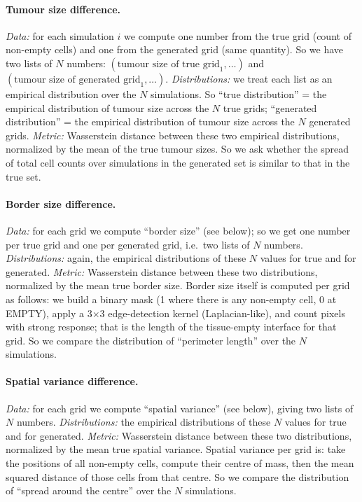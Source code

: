 \documentclass[11pt,a4paper]{article}
\begin{document}
\paragraph{Tumour size difference.} \emph{Data:} for each simulation \(i\) we compute one number from the true grid (count of non-empty cells) and one from the generated grid (same quantity). So we have two lists of \(N\) numbers: \((\text{tumour size of true grid}_1,\dots)\) and \((\text{tumour size of generated grid}_1,\dots)\). \emph{Distributions:} we treat each list as an empirical distribution over the \(N\) simulations. So ``true distribution'' = the empirical distribution of tumour size across the \(N\) true grids; ``generated distribution'' = the empirical distribution of tumour size across the \(N\) generated grids. \emph{Metric:} Wasserstein distance between these two empirical distributions, normalized by the mean of the true tumour sizes. So we ask whether the spread of total cell counts over simulations in the generated set is similar to that in the true set.

\paragraph{Border size difference.} \emph{Data:} for each grid we compute ``border size'' (see below); so we get one number per true grid and one per generated grid, i.e.\ two lists of \(N\) numbers. \emph{Distributions:} again, the empirical distributions of these \(N\) values for true and for generated. \emph{Metric:} Wasserstein distance between these two distributions, normalized by the mean true border size. Border size itself is computed per grid as follows: we build a binary mask (1 where there is any non-empty cell, 0 at EMPTY), apply a 3\(\times\)3 edge-detection kernel (Laplacian-like), and count pixels with strong response; that is the length of the tissue-empty interface for that grid. So we compare the distribution of ``perimeter length'' over the \(N\) simulations.

\paragraph{Spatial variance difference.} \emph{Data:} for each grid we compute ``spatial variance'' (see below), giving two lists of \(N\) numbers. \emph{Distributions:} the empirical distributions of these \(N\) values for true and for generated. \emph{Metric:} Wasserstein distance between these two distributions, normalized by the mean true spatial variance. Spatial variance per grid is: take the positions of all non-empty cells, compute their centre of mass, then the mean squared distance of those cells from that centre. So we compare the distribution of ``spread around the centre'' over the \(N\) simulations.
\end{document}
